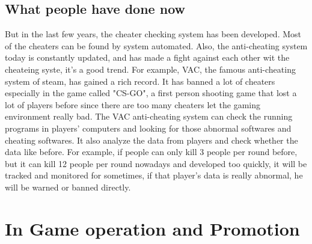 \documentclass[12pt]{article}
\begin{document}
        \subsection{What people have done now}
            But in the last few years, the cheater checking system has been developed. Most of the cheaters
            can be found by system automated. Also, the anti-cheating system today is constantly updated,
            and has made a fight against each other wit the cheateing syste, it's a good trend. For
            example, VAC, the famous anti-cheating system of steam, has gained a rich record. It has
            banned a lot of cheaters especially in the game called "CS-GO", a first person shooting
            game that lost a lot of players before since there are too many cheaters let the gaming
            environment really bad. The VAC anti-cheating system can check the running programs in
            players' computers and looking for those abnormal softwares and cheating softwares. It
            also analyze the data from players and check whether the data like before. For example,
            if people can only kill 3 people per round before, but it can kill 12 people per round
            nowadays and developed too quickly, it will be tracked and monitored for sometimes, if
            that player's data is really abnormal, he will be warned or banned directly.
    \section{In Game operation and Promotion}
\end{document}
